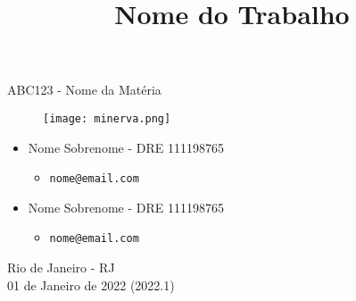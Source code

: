 \title{Nome do Trabalho}

\begin{titlepage}
    \begin{center}
        \LARGE
        ABC123 - Nome da Matéria
        

        \vspace{1.5cm}

        \Huge
        \thetitle

        \vspace{1.5cm}

        \Huge
        \begin{figure}[h]
            \centering
            \texttt{[image: minerva.png]}
        \end{figure}

        \vspace{2.5cm}

        \large
        \begin{itemize}
            \item Nome Sobrenome - DRE 111198765
                \begin{itemize}
                    \item \texttt{nome@email.com}
                \end{itemize}
            \item Nome Sobrenome - DRE 111198765
                \begin{itemize}
                    \item \texttt{nome@email.com}
                \end{itemize}
        \end{itemize}

        \vspace{1.5cm}


        \vfill
        
        \large
        Rio de Janeiro - RJ\\
        01 de Janeiro de 2022 (2022.1)

    \end{center}
\end{titlepage}